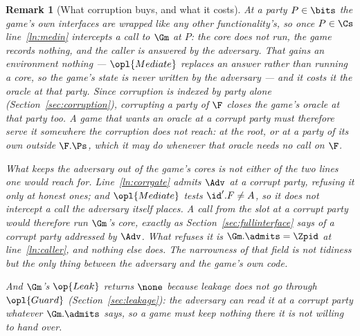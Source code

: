 \documentclass[10pt,oneside,openany]{book}
\theoremstyle{accentdef}
\newtheorem{remark}[definition]{Remark}
\theoremstyle{accentplain}
\begin{document}
\begin{remark}[What corruption buys, and what it costs]\label{rem:gmcorr}
At a party $P \in \bits$ the game's own interfaces are wrapped like any other functionality's, so
once $P \in \Cs$ line~\ref{ln:medin} intercepts a call to $\Gm$ at $P$: the core does not run, the
game records nothing, and the caller is answered by the adversary. That gains an environment nothing
--- $\opl{Mediate}$ replaces an answer rather than running a core, so the game's state is never
written by the adversary --- and it costs it the oracle at that party. Since corruption is indexed by
party alone (Section~\ref{sec:corruption}), corrupting a party of $\F$ closes the game's oracle at
that party too. A game that wants an oracle at a corrupt party must therefore serve it somewhere the
corruption does not reach: at the root, or at a party of its own outside $\F.\Ps$, which it may do
whenever that oracle needs no call on $\F$.

What keeps the adversary out of the game's cores is not either of the two lines one would reach for.
Line~\ref{ln:corrgate} \emph{admits} $\Adv$ at a corrupt party, refusing it only at honest ones; and
$\opl{Mediate}$ tests $\id'.F \neq A$, so it does not intercept a call the adversary itself places.
A call from the slot at a corrupt party would therefore run $\Gm$'s core, exactly as
Section~\ref{sec:fullinterface} says of a corrupt party addressed by $\Adv$. What refuses it is
$\Gm.\admits = \Zpid$ at line~\ref{ln:caller}, and nothing else does. The narrowness of that field is
not tidiness but the only thing between the adversary and the game's own code.

And $\Gm$'s $\op{Leak}$ returns $\none$ because leakage
does not go through $\opl{Guard}$ (Section~\ref{sec:leakage}): the adversary can read it at a corrupt
party whatever $\Gm.\admits$ says, so a game must keep nothing there it is not willing to hand over.
\end{remark}
\end{document}
